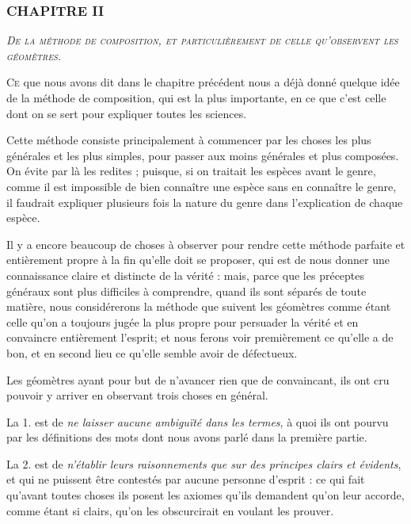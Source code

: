 \subsubsection{\centering \Large CHAPITRE II}
\begin{center}\emph{\large\scshape De la méthode de composition, et particulièrement de celle qu'observent les géomètres.}\end{center}

	\lettrine{C}{e} que nous avons dit dans le chapitre précédent nous a déjà donné quelque idée de la méthode de composition, qui est la plus importante, en ce que c'est celle dont on se sert pour expliquer toutes les sciences.

Cette méthode consiste principalement à commencer par les choses les plus générales et les plus simples, pour passer aux moins générales et plus composées. On évite par là les redites ; puisque, si on traitait les espèces avant le genre, comme il est impossible de bien connaître une espèce sans en connaître le genre, il faudrait expliquer plusieurs fois la nature du genre dans l'explication de chaque espèce.

Il y a encore beaucoup de choses à observer pour rendre cette méthode parfaite et entièrement propre à la fin qu'elle doit se proposer, qui est de nous donner une connaissance claire et distincte de la vérité : mais, parce que les préceptes généraux sont plus difficiles à comprendre, quand ils sont séparés de toute matière, nous considérerons la méthode que suivent les géomètres comme étant celle qu'on a toujours jugée la plus propre pour persuader la vérité et en convaincre entièrement l'esprit; et nous ferons voir premièrement ce qu'elle a de bon, et en second lieu ce qu'elle semble avoir de défectueux.

Les géomètres ayant pour but de n'avancer rien que de convaincant, ils ont cru pouvoir y arriver en observant trois choses en général.

La 1. est de \emph{ne laisser aucune ambiguïté dans les termes}, à quoi ils ont pourvu par les définitions des mots dont nous avons parlé dans la première partie.

La 2. est de \emph{n'établir leurs raisonnements que sur des principes clairs et évidents}, et qui ne puissent être contestés par aucune personne d'esprit : ce qui fait qu'avant toutes choses ils posent les axiomes qu'ils demandent qu'on leur accorde, comme étant si clairs, qu'on les obscurcirait en voulant les prouver.

